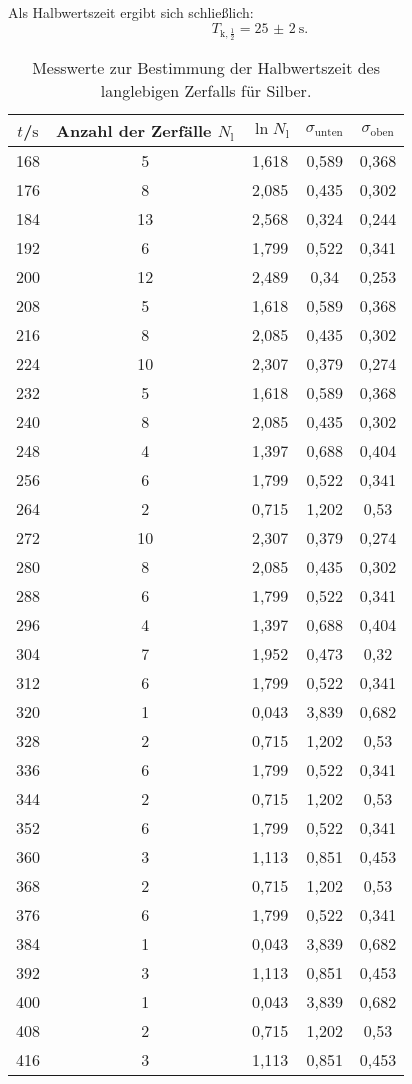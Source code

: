 Als Halbwertszeit ergibt sich schließlich:
\begin{equation}
	T_{\mathrm{k},\frac{1}{2}}=\SI{25(2)}{\second}\text{.}
\end{equation}

\begin{table}
	\centering
	\caption{Messwerte zur Bestimmung der Halbwertszeit des langlebigen Zerfalls für Silber.}
	\label{tab:silver2}
	\begin{tabular}{ccccc}
		\toprule
		$t$/$\si{\second}$ & Anzahl der Zerfälle $N_\mathrm{l}$ &$\ln{N_\mathrm{l}}$ &$\sigma_\mathrm{unten}$ &$\sigma_\mathrm{oben}$\\
		\midrule
		168  & 5  & 1,618 & 0,589 & 0,368 \\
		176  & 8  & 2,085 & 0,435 & 0,302 \\
		184  & 13  & 2,568 & 0,324 & 0,244 \\
		192  & 6  & 1,799 & 0,522 & 0,341 \\
		200  & 12  & 2,489 & 0,34 & 0,253 \\
		208  & 5  & 1,618 & 0,589 & 0,368 \\
		216  & 8  & 2,085 & 0,435 & 0,302 \\
		224  & 10  & 2,307 & 0,379 & 0,274 \\
		232  & 5  & 1,618 & 0,589 & 0,368 \\
		240  & 8  & 2,085 & 0,435 & 0,302 \\
		248  & 4  & 1,397 & 0,688 & 0,404 \\
		256  & 6  & 1,799 & 0,522 & 0,341 \\
		264  & 2  & 0,715 & 1,202 & 0,53 \\
		272  & 10  & 2,307 & 0,379 & 0,274 \\
		280  & 8  & 2,085 & 0,435 & 0,302 \\
		288  & 6  & 1,799 & 0,522 & 0,341 \\
		296  & 4  & 1,397 & 0,688 & 0,404 \\
		304  & 7  & 1,952 & 0,473 & 0,32 \\
		312  & 6  & 1,799 & 0,522 & 0,341 \\
		320  & 1  & 0,043 & 3,839 & 0,682 \\
		328  & 2  & 0,715 & 1,202 & 0,53 \\
		336  & 6  & 1,799 & 0,522 & 0,341 \\
		344  & 2  & 0,715 & 1,202 & 0,53 \\
		352  & 6  & 1,799 & 0,522 & 0,341 \\
		360  & 3  & 1,113 & 0,851 & 0,453 \\
		368  & 2  & 0,715 & 1,202 & 0,53 \\
		376  & 6  & 1,799 & 0,522 & 0,341 \\
		384  & 1  & 0,043 & 3,839 & 0,682 \\
		392  & 3  & 1,113 & 0,851 & 0,453 \\
		400  & 1  & 0,043 & 3,839 & 0,682 \\
		408  & 2  & 0,715 & 1,202 & 0,53 \\
		416  & 3  & 1,113 & 0,851 & 0,453 \\
		\bottomrule
	\end{tabular}
\end{table}

